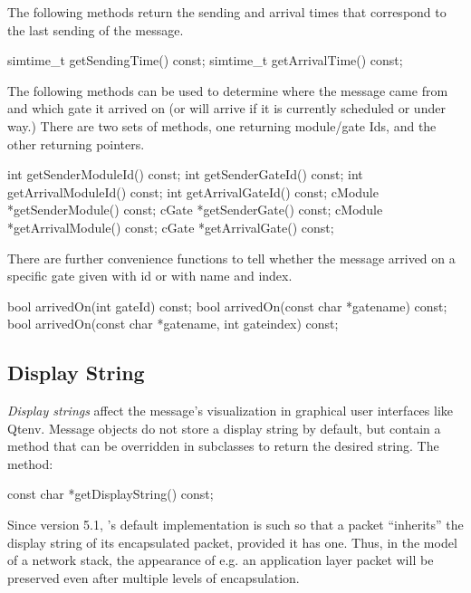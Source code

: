 The following methods return the sending and arrival times that correspond
to the last sending of the message.

\begin{cpp}
simtime_t getSendingTime() const;
simtime_t getArrivalTime() const;
\end{cpp}

The following methods can be used to determine where the message came from
and which gate it arrived on (or will arrive if it is currently scheduled
or under way.) There are two sets of methods, one returning module/gate Ids,
and the other returning pointers.

\begin{cpp}
int getSenderModuleId() const;
int getSenderGateId() const;
int getArrivalModuleId() const;
int getArrivalGateId() const;
cModule *getSenderModule() const;
cGate *getSenderGate() const;
cModule *getArrivalModule() const;
cGate *getArrivalGate() const;
\end{cpp}

There are further convenience functions to tell whether
the message arrived on a specific gate given with id or
with name and index.

\begin{cpp}
bool arrivedOn(int gateId) const;
bool arrivedOn(const char *gatename) const;
bool arrivedOn(const char *gatename, int gateindex) const;
\end{cpp}


\subsection{Display String}
\label{sec:messages:displaystring}

\textit{Display strings} affect the message's visualization in graphical
user interfaces like Qtenv. Message objects do not store a
display string by default, but contain a  method
that can be overridden in subclasses to return the desired string.  The
method:

\begin{cpp}
const char *getDisplayString() const;
\end{cpp}

Since {\opp} version 5.1, 's default 
implementation is such so that a packet ``inherits'' the display string of its
encapsulated packet, provided it has one. Thus, in the model of a network stack,
the appearance of e.g. an application layer packet will be preserved even
after multiple levels of encapsulation.

